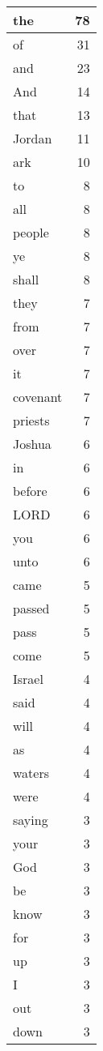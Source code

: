 \begin{center}
\begin{longtable}{l|r}
\hline \hline
\endlastfoot
the & 78 \\ \hline
of & 31 \\ \hline
and & 23 \\ \hline
And & 14 \\ \hline
that & 13 \\ \hline
Jordan & 11 \\ \hline
ark & 10 \\ \hline
to & 8 \\ \hline
all & 8 \\ \hline
people & 8 \\ \hline
ye & 8 \\ \hline
shall & 8 \\ \hline
they & 7 \\ \hline
from & 7 \\ \hline
over & 7 \\ \hline
it & 7 \\ \hline
covenant & 7 \\ \hline
priests & 7 \\ \hline
Joshua & 6 \\ \hline
in & 6 \\ \hline
before & 6 \\ \hline
LORD & 6 \\ \hline
you & 6 \\ \hline
unto & 6 \\ \hline
came & 5 \\ \hline
passed & 5 \\ \hline
pass & 5 \\ \hline
come & 5 \\ \hline
Israel & 4 \\ \hline
said & 4 \\ \hline
will & 4 \\ \hline
as & 4 \\ \hline
waters & 4 \\ \hline
were & 4 \\ \hline
saying & 3 \\ \hline
your & 3 \\ \hline
God & 3 \\ \hline
be & 3 \\ \hline
know & 3 \\ \hline
for & 3 \\ \hline
up & 3 \\ \hline
I & 3 \\ \hline
out & 3 \\ \hline
down & 3 \\ \hline

\end{longtable}
\end{center}

